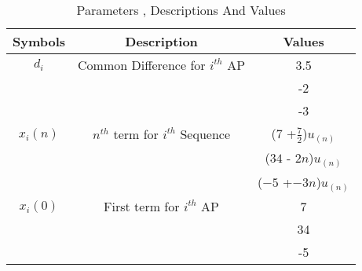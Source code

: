 \begin{table}[ht!]
\centering
\begin{tabular}{ |c|c|c| } 
 \hline
Symbols & Description & Values  \\
 \hline
$d_i$ & Common Difference for $i^{th}$ AP & 3.5 \\ \cline{3-3}
 & & -2 \\ \cline{3-3}
 & & -3 \\ 
\hline

  $x_i(n)$ & $n^{th}$ term for $i^{th}$ Sequence &  ($7$ +$\frac{7}{2}$)$u_{(n)}$\\ \cline{3-3}
 & &  ($34$ - $2n$)$u_{(n)}$ \\ \cline{3-3}
 & &  ($-5$ +$-3n$)$u_{(n)}$ \\ 
\hline


  $x_i(0)$ & First term for $i^{th}$ AP & 7 \\ \cline{3-3}
 & & 34 \\ \cline{3-3}
 & & -5 \\ 
\hline
  
   \hline
\end{tabular}
\caption{Parameters , Descriptions And Values }
\label{table:ee25-tab1}
\end{table}

